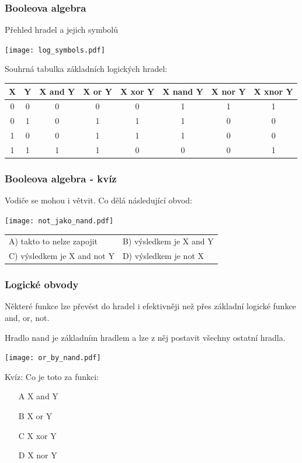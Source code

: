 \documentclass{beamer}
\begin{document}
\begin{frame}
\frametitle{Booleova algebra}

Přehled hradel a jejich symbolů
\begin{center}
   \texttt{[image: log\_symbols.pdf]}
\end{center}

Souhrná tabulka základních logických hradel:
\begin{tabular}{|c|c|c|c|c|c|c|c|}\hline
X & Y & X and Y & X or Y & X xor Y & X nand Y & X nor Y & X xnor Y \\\hline
0 & 0 &    0    &   0    &    0    &     1    &    1    &    1     \\\hline
0 & 1 &    0    &   1    &    1    &     1    &    0    &    0     \\\hline
1 & 0 &    0    &   1    &    1    &     1    &    0    &    0     \\\hline
1 & 1 &    1    &   1    &    0    &     0    &    0    &    1     \\\hline
\end{tabular}

\end{frame}


\begin{frame}
\frametitle{Booleova algebra - kvíz}

Vodiče se mohou i větvit. Co dělá následující obvod:
\begin{center}
   \texttt{[image: not\_jako\_nand.pdf]}
\end{center}

\begin{tabular}{ll}
A) takto to nelze zapojit \phantom{XXXX} & B) výsledkem je X and Y\\
C) výsledkem je X and not Y              & D) výsledkem je not X
\end{tabular}

\end{frame}


\begin{frame}
\frametitle{Logické obvody}

Některé funkce lze převést do hradel i efektivněji než přes základní logické funkce and, or, not.

Hradlo nand je základním hradlem a lze z něj postavit všechny ostatní hradla.

\begin{center}
   \texttt{[image: or\_by\_nand.pdf]}
\end{center}

Kvíz: Co je toto za funkci:
\begin{itemize}
\item[A] X and Y
\item[B] X or Y
\item[C] X xor Y
\item[D] X nor Y
\end{itemize}

\end{frame}
\end{document}
